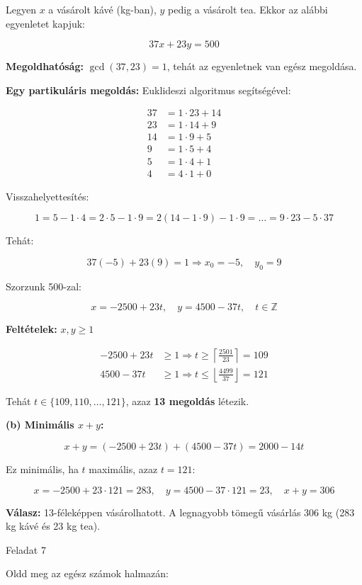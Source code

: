 \begin{solution}
Legyen $x$ a vásárolt kávé (kg-ban), $y$ pedig a vásárolt tea. Ekkor
az alábbi egyenletet kapjuk:

\[
37x+23y=500\tag{1}
\]

\textbf{Megoldhatóság:} $\gcd(37,23)=1$, tehát az egyenletnek van
egész megoldása.

\textbf{Egy partikuláris megoldás:} Euklideszi algoritmus segítségével:

\begin{align*}
37 & =1\cdot23+14\\
23 & =1\cdot14+9\\
14 & =1\cdot9+5\\
9 & =1\cdot5+4\\
5 & =1\cdot4+1\\
4 & =4\cdot1+0
\end{align*}

Visszahelyettesítés:

\[
1=5-1\cdot4=2\cdot5-1\cdot9=2(14-1\cdot9)-1\cdot9=\ldots=9\cdot23-5\cdot37
\]

Tehát:

\[
37(-5)+23(9)=1\Rightarrow x_{0}=-5,\quad y_{0}=9
\]

Szorzunk 500-zal:

\[
x=-2500+23t,\quad y=4500-37t,\quad t\in\mathbb{Z}
\]

\textbf{Feltételek:} $x,y\geq1$

\begin{align*}
-2500+23t & \geq1\Rightarrow t\geq\left\lceil \frac{2501}{23}\right\rceil =109\\
4500-37t & \geq1\Rightarrow t\leq\left\lfloor \frac{4499}{37}\right\rfloor =121
\end{align*}

Tehát $t\in\{109,110,\dots,121\}$, azaz \textbf{13 megoldás} létezik.

\textbf{(b) Minimális $x+y$:}

\[
x+y=(-2500+23t)+(4500-37t)=2000-14t
\]

Ez minimális, ha $t$ maximális, azaz $t=121$:

\[
x=-2500+23\cdot121=283,\quad y=4500-37\cdot121=23,\quad x+y=306
\]

\textbf{Válasz:} 13-féleképpen vásárolhatott. A legnagyobb tömegű
vásárlás 306 kg (283 kg kávé és 23 kg tea).

Feladat 7

Oldd meg az egész számok halmazán:


\end{solution}
